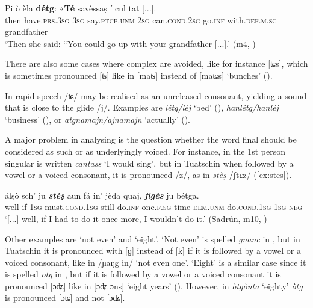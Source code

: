 \ea\label{ex:ass2}
\gll Pi ò èla \textbf{détg}: «\textbf{Té} savèssaṣ í cul tat [...].\\
then have.\textsc{prs.3sg} \textsc{3sg} say.\textsc{ptcp.unm} \textsc{2sg} can.\textsc{cond.2sg} go.\textsc{inf}  with.\textsc{def.m.sg} grandfather\\
\glt `Then she said: “You could go up with your grandfather [...].' (m4,  )
\z

There are also some cases where complex  are avoided, like for instance [ʨs], which is sometimes pronounced [ʦ] like in [maʦ] instead of [maʨs] `bunches' ().

In rapid speech /ʨ/ may be realised as an unreleased consonant, yielding a sound that is close to the glide /j/. Examples are \textit{létg/léj} `bed'  (), \textit{hanlétg/hanléj} `business' (), or \textit{atgnamajn/ajnamajn} `actually' ().

A major problem in analysing  is the question whether the  word final  should be considered as such or as underlyingly voiced. For instance, in  the 1st person singular  is written \textit{cantass} `I would sing', but in Tuatschin when followed by a vowel or a voiced consonant, it is pronounced /z/, as in \textit{stèṣ} /ʃtɛz/ (\ref{ex:stes}).

\ea\label{ex:stes}
\gll [...] álṣò sch' ju \textit{\textbf{stèṣ}} aun fá in' jèda quaj, \textit{\textbf{figès}} ju bétga.\\
{} well if \textsc{1sg} must.\textsc{cond.1sg} still do.\textsc{inf} one.\textsc{f.sg} time \textsc{dem.unm} do.\textsc{cond.1sg} \textsc{1sg} \textsc{neg}\\
\glt `[...] well, if I had to do it once more, I wouldn't do it.' (Sadrún, m10, )
\z

Other examples are `not even' and `eight'. `Not even' is spelled \textit{gnanc} in , but in Tuatschin it is pronounced with [ɡ] instead of [k] if it is followed by a vowel or a voiced consonant, like in /ɲaŋg in/ `not even one'. `Eight' is a similar case since it is spelled \textit{otg} in , but if it is followed by a vowel or a voiced consonant it is pronounced [ɔʥ] like in [ɔʥ ɔns] `eight years' (). However, in \textit{òtgònta} `eighty' \textit{òtg} is pronounced [ɔʨ] and not [ɔʥ]. 


